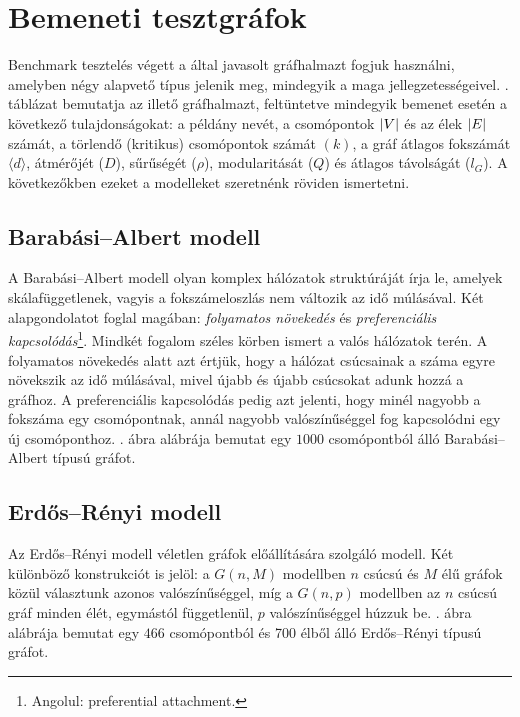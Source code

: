 \section{Bemeneti tesztgráfok}\label{sec:BENCHMARK-PROBLEM-INSTANCES}
Benchmark tesztelés végett a  által javasolt gráfhalmazt fogjuk használni, amelyben négy alapvető típus jelenik meg, mindegyik a maga jellegzetességeivel.
. táblázat bemutatja az illető gráfhalmazt, feltüntetve mindegyik bemenet esetén a következő tulajdonságokat:
a példány nevét, a csomópontok $\lvert V\rvert$ és az élek $\lvert E\rvert$ számát, a törlendő (kritikus) csomópontok számát $\left( k \right)$,
a gráf átlagos fokszámát $\langle d \rangle$, átmérőjét ($D$), sűrűségét ($\rho$), modularitását ($Q$) és átlagos távolságát ($l_G$).
A következőkben ezeket a modelleket szeretnénk röviden ismertetni.


\subsection{Barabási–Albert modell}
A Barabási–Albert modell olyan komplex hálózatok struktúráját írja le, amelyek skálafüggetlenek, vagyis a fokszámeloszlás nem változik az idő múlásával.
Két alapgondolatot foglal magában: \textit{folyamatos növekedés} és \textit{preferenciális kapcsolódás}\footnote{ Angolul: preferential attachment. }. Mindkét fogalom széles körben ismert a valós hálózatok terén.
A folyamatos növekedés alatt azt értjük, hogy a hálózat csúcsainak a száma egyre növekszik az idő múlásával, mivel újabb és újabb csúcsokat adunk hozzá a gráfhoz.
A preferenciális kapcsolódás pedig azt jelenti, hogy minél nagyobb a fokszáma egy csomópontnak, annál nagyobb valószínűséggel fog kapcsolódni egy új csomóponthoz.
. ábra  alábrája bemutat egy $1000$ csomópontból álló Barabási–Albert típusú gráfot.


\subsection{Erdős–Rényi modell}
Az Erdős–Rényi modell véletlen gráfok előállítására szolgáló modell. Két különböző konstrukciót is jelöl:
a $G(n, M)$ modellben $n$ csúcsú és $M$ élű gráfok közül választunk azonos valószínűséggel,
míg a $G(n, p)$ modellben az $n$ csúcsú gráf minden élét, egymástól függetlenül, $p$ valószínűséggel húzzuk be.
. ábra  alábrája bemutat egy $466$ csomópontból és 700 élből álló Erdős–Rényi típusú gráfot.


